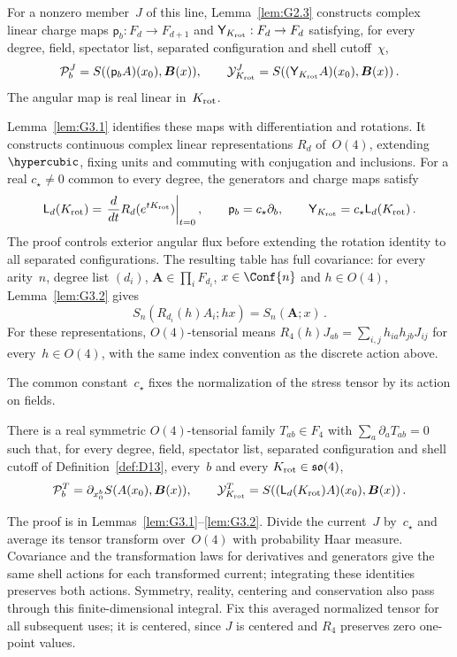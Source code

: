 For a nonzero member~$J$ of this line, Lemma~\ref{lem:G2.3} constructs complex linear charge maps $\mathsf p_b:F_d\to F_{d+1}$ and $\mathsf Y_{K_{\rm rot}}:F_d\to F_d$ satisfying, for every degree, field, spectator list, separated configuration and shell cutoff~$\chi$,
\begin{equation*}
\mathcal P_b^J=S((\mathsf p_bA)(x_0),\boldsymbol B(x)),\qquad
\mathcal Y_{K_{\rm rot}}^J=S((\mathsf Y_{K_{\rm rot}}A)(x_0),\boldsymbol B(x))\,.
\end{equation*}
The angular map is real linear in~$K_{\rm rot}$.

Lemma~\ref{lem:G3.1} identifies these maps with differentiation and rotations. It constructs continuous complex linear representations $R_d$ of~$O(4)$, extending~$\hypercubic$, fixing units and commuting with conjugation and inclusions. For a real $c_\star\ne0$ common to every degree, the generators and charge maps satisfy
\begin{equation*}
\mathsf L_d(K_{\rm rot})=\left.\frac{d}{dt}R_d(e^{tK_{\rm rot}})\right|_{t=0},
\qquad \mathsf p_b=c_\star\partial_b,\qquad
\mathsf Y_{K_{\rm rot}}=c_\star\mathsf L_d(K_{\rm rot})\,.
\end{equation*}
The proof controls exterior angular flux before extending the rotation identity to all separated configurations. The resulting table has full covariance: for every arity~$n$, degree list $(d_i)$, $\boldsymbol A\in\prod_iF_{d_i}$, $x\in\Conf{n}$ and $h\in O(4)$, Lemma~\ref{lem:G3.2} gives
\begin{equation*}
S_n(R_{d_i}(h)A_i;hx)=S_n(\boldsymbol A;x)\,.
\end{equation*}
For these representations, $O(4)$-tensorial means $R_4(h)J_{ab}=\sum_{i,j}h_{ia}h_{jb}J_{ij}$ for every~$h\in O(4)$, with the same index convention as the discrete action above.

The common constant~$c_\star$ fixes the normalization of the stress tensor by its action on fields.
\begin{theorem}\label{prop:ST}\label{thm:ST}
There is a real symmetric $O(4)$-tensorial family $T_{ab}\in F_4$ with $\sum_a\partial_aT_{ab}=0$ such that, for every degree, field, spectator list, separated configuration and shell cutoff of Definition~\ref{def:D13}, every~$b$ and every $K_{\rm rot}\in\mathfrak{so}(4)$,
\begin{equation*}
\mathcal P_b^T=\partial_{x_0^b}S(A(x_0),\boldsymbol B(x)),\qquad
\mathcal Y_{K_{\rm rot}}^T=S((\mathsf L_d(K_{\rm rot})A)(x_0),\boldsymbol B(x))\,.
\end{equation*}
\end{theorem}
The proof is in Lemmas~\ref{lem:G3.1}--\ref{lem:G3.2}. Divide the current~$J$ by~$c_\star$ and average its tensor transform over~$O(4)$ with probability Haar measure. Covariance and the transformation laws for derivatives and generators give the same shell actions for each transformed current; integrating these identities preserves both actions. Symmetry, reality, centering and conservation also pass through this finite-dimensional integral. Fix this averaged normalized tensor for all subsequent uses; it is centered, since $J$ is centered and $R_4$ preserves zero one-point values.

